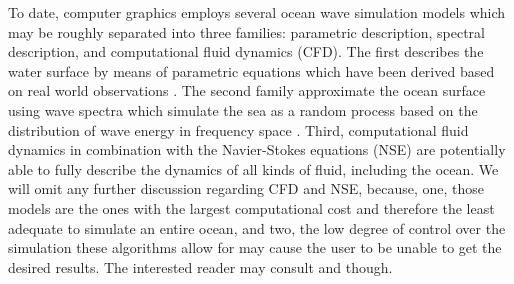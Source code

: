 To date, computer graphics employs several ocean wave simulation models which
may be roughly separated into three families: parametric description, spectral
description, and computational fluid dynamics (CFD). The first describes the water
surface by means of parametric equations which have been derived based on real
world observations \citep{Gerstner:1809,Rankine:1863,Biesel:1952}.
The second family approximate the ocean surface using wave spectra which
simulate the sea as a random process based on the distribution of wave energy
in frequency space \citep{book:kinsman2002wind}.
Third, computational fluid dynamics in combination with the Navier-Stokes
equations (NSE) are potentially able to fully describe the dynamics of all kinds of
fluid, including the ocean. We will omit any further discussion regarding CFD and NSE,
because, one, those models are the ones with the largest computational cost and therefore
the least adequate to simulate an entire ocean, and two,
the low degree of control over the simulation these algorithms allow for
may cause the user to be unable to get the desired results.
The interested reader may consult \cite{Bridson:2015} and \cite{egstar:2014} though.
%

